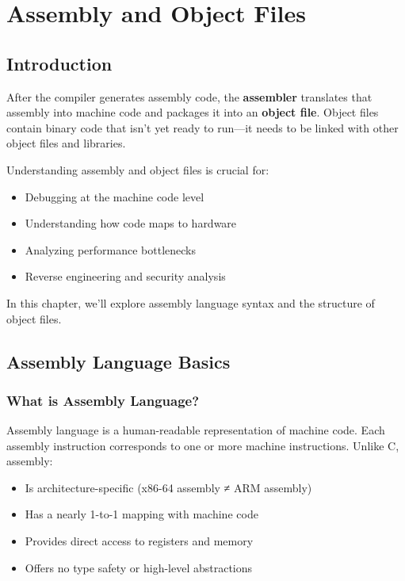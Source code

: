 \chapter{Assembly and Object Files}

\section{Introduction}

After the compiler generates assembly code, the \textbf{assembler} translates that assembly into machine code and packages it into an \textbf{object file}. Object files contain binary code that isn't yet ready to run—it needs to be linked with other object files and libraries.

Understanding assembly and object files is crucial for:
\begin{itemize}
    \item Debugging at the machine code level
    \item Understanding how code maps to hardware
    \item Analyzing performance bottlenecks
    \item Reverse engineering and security analysis
\end{itemize}

In this chapter, we'll explore assembly language syntax and the structure of object files.

\section{Assembly Language Basics}

\subsection{What is Assembly Language?}

Assembly language is a human-readable representation of machine code. Each assembly instruction corresponds to one or more machine instructions. Unlike C, assembly:
\begin{itemize}
    \item Is architecture-specific (x86-64 assembly ≠ ARM assembly)
    \item Has a nearly 1-to-1 mapping with machine code
    \item Provides direct access to registers and memory
    \item Offers no type safety or high-level abstractions
\end{itemize}

